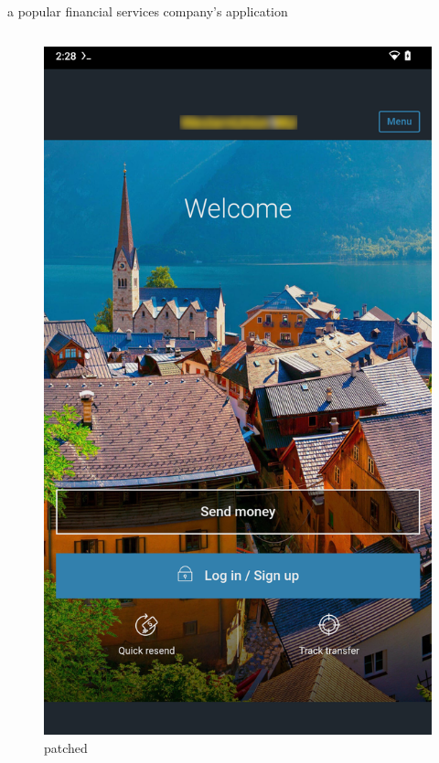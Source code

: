 \documentclass{beamer}
\begin{document}
\begin{frame}[fragile]{a popular financial services company's application}
\begin{columns}
            \begin{figure}
            \centering
            \includegraphics[scale=0.07]{wu-patched.png}
            \caption{patched}
            \end{figure}
    \end{columns}
\end{frame}
\end{document}
